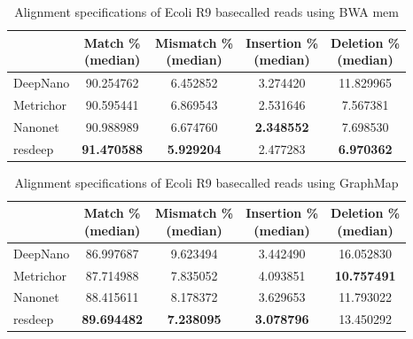 \documentclass[times, utf8, diplomski, numeric, english]{fer}
\begin{document}
\begin{table}[htb]
	\caption{Alignment specifications of Ecoli R9 basecalled reads using BWA mem}
	\label{tbl:ecoli_rates_bwa}
	\centering
	\begin{tabular}{lcccc}
		\toprule
		{} &  \thead{Match \% \\(median)} &  \thead{Mismatch \% \\(median)} &  \thead{Insertion \% \\(median)} &  \thead{Deletion \% \\(median)} \\
		\midrule
		DeepNano   &                  90.254762 &                      6.452852 &                       3.274420 &                     11.829965 \\
		Metrichor  &                  90.595441 &                      6.869543 &                       2.531646 &                      7.567381 \\
		Nanonet    &                  90.988989 &                      6.674760 &                     \textbf{  2.348552} &                      7.698530 \\
		resdeep    &                 \textbf{ 91.470588} &                      \textbf{5.929204 }&                       2.477283 &                     \textbf{ 6.970362} \\
		\bottomrule
	\end{tabular}
	
\end{table}
\begin{table}[htb]
	\caption{Alignment specifications of Ecoli R9 basecalled reads using GraphMap}
	\label{tbl:lambda_rates}
	\centering
	\begin{tabular}{lcccc}
		\toprule
		{} &  \thead{Match \% \\(median)} &  \thead{Mismatch \% \\(median)} &  \thead{Insertion \% \\(median)} &  \thead{Deletion \% \\(median)} \\
		\midrule
		DeepNano   &                  86.997687 &                      9.623494 &                       3.442490 &                     16.052830 \\
		Metrichor  &                  87.714988 &                      7.835052 &                       4.093851 &                     \textbf{10.757491} \\
		Nanonet    &                  88.415611 &                      8.178372 &                       3.629653 &                     11.793022 \\
		resdeep    &                 \textbf{ 89.694482} &                     \textbf{ 7.238095} &                       \textbf{3.078796} &                     13.450292 \\
		\bottomrule
	\end{tabular}
	
	
	
	
\end{table}
\end{document}

